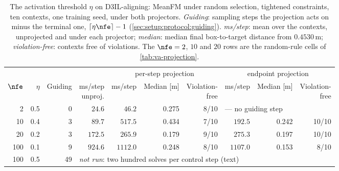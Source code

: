 \begin{table}[htpb]
  \caption[Alignment: the activation threshold across the budget ladder]{The activation threshold
  $\eta$ on D3IL-aligning: MeanFM under random selection, tightened constraints, ten contexts, one
  training seed, under both projectors. \emph{Guiding}: sampling steps the projection acts on minus the
  terminal one, $\lceil \eta\nfe \rceil - 1$ (\autoref{sec:setup:protocol:guiding}). \emph{ms/step}:
  mean over the contexts, unprojected and under each projector;
  \emph{median}: median final box-to-target distance from $0.4530$\,m; \emph{violation-free}: contexts free of
  violations. The $\nfe=2$, $10$ and $20$ rows are the random-rule cells of \autoref{tab:va-projection}.}
  \label{tab:va-threshold}
  \centering
  \footnotesize
  \setlength{\tabcolsep}{3pt}
  \begin{tabularx}{\linewidth}{@{}r r r r rrr rrr@{}}
    \toprule
    & & & & \multicolumn{3}{c}{per-step projection} & \multicolumn{3}{c}{endpoint projection} \\
    \cmidrule(lr){5-7}\cmidrule(l){8-10}
    $\nfe$ & $\eta$ & Guiding & \shortstack{ms/step\\unproj.} & ms/step & Median [m] & \shortstack{Violation-\\free} & ms/step & Median [m] & \shortstack{Violation-\\free} \\
    \midrule
    2   & 0.5 & 0  & $24.6$  & $46.2$  & 0.275 & 8/10  & \multicolumn{3}{l}{--- no guiding step} \\
    10  & 0.4 & 3  & $89.7$  & $517.5$ & 0.434 & 7/10  & $192.5$ & 0.242 & 10/10 \\
    20  & 0.2 & 3  & $172.5$ & $265.9$ & 0.179 & 9/10  & $275.3$ & 0.197 & 10/10 \\
    100 & 0.1 & 9  & $924.6$ & $1112.0$ & 0.248 & 8/10 & $1107.0$ & 0.153 & 8/10 \\
    100 & 0.5 & 49 & \multicolumn{7}{l}{\emph{not run}: two hundred solves per control step (text)} \\
    \bottomrule
  \end{tabularx}
\end{table}

